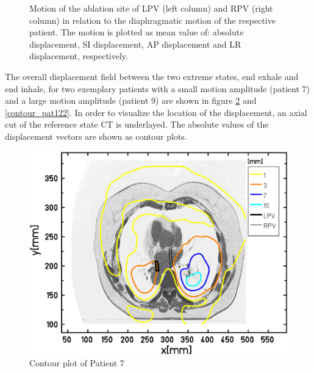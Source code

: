 \documentclass[type=dr, dr=rernat, accentcolor=tud7b,colorbacktitle, bigchapter, openright, twoside, 12pt ]{tudthesis}
\begin{document}
\begin{figure}[H]
{ }
\caption{Motion of the ablation site of LPV (left column) and RPV (right column) in relation to the diaphragmatic motion of the respective patient. 
The motion is plotted as mean value of: absolute displacement, SI displacement, AP displacement and LR displacement, respectively.}
\label{corr_motion}
\end{figure}

\newpage

The overall displacement field between the two extreme states, end exhale and end inhale, for two exemplary patients with a small motion 
amplitude (patient 7) and a large motion amplitude (patient 9) are shown in figure \ref{contour_pat036} and \ref{contour_pat122}. In order to 
visualize the location of the displacement, an axial cut of the reference state CT is underlayed. The absolute values of the displacement 
vectors are shown as contour plots. 

\begin{figure}[H]
\begin{center}
 \includegraphics[scale=0.22]{Contour_z_abs_RESP_Pat037_gedreht.png}
\caption{Contour plot of Patient 7}
\label{contour_pat036}
\end{center}
\end{figure}
\end{document}
